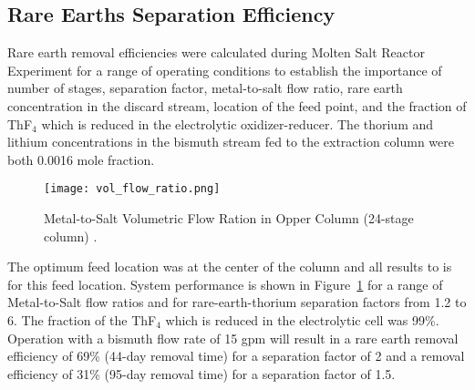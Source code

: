 \subsection{Rare Earths Separation Efficiency} \label{sec:rare_earth_eff}
Rare earth removal efficiencies were calculated during Molten Salt Reactor Experiment for a range of operating conditions to establish the importance of number of stages, separation factor, metal-to-salt flow ratio, rare earth concentration in the discard stream, location of the feed point, and the fraction of ThF$_4$ which is reduced in the electrolytic oxidizer-reducer. The thorium and lithium concentrations in the bismuth stream fed to the extraction column were both 0.0016 mole fraction. 
\begin{figure}[htbp!]
    \begin{center}
        \texttt{[image: vol\_flow\_ratio.png]}
    \end{center}
    \caption{Metal-to-Salt Volumetric Flow Ration in Opper Column (24-stage column) \cite{briggs_molten-salt_1969}.}
    \label{fig:vol-flow-ratio}
\end{figure}

The optimum feed location was at the center of the column and all results to is for this feed
location. System performance is shown in Figure~\ref{fig:vol-flow-ratio} for a range of Metal-to-Salt flow ratios and for rare-earth-thorium separation factors from 1.2 to 6. The fraction of the ThF$_4$ which is reduced in the electrolytic cell was 99\%. Operation with a bismuth flow rate of 15 gpm will result in a rare earth removal efficiency of 69\% (44-day removal time) for a separation factor of 2 and a removal efficiency of 31\% (95-day removal time) for a separation factor of 1.5.

